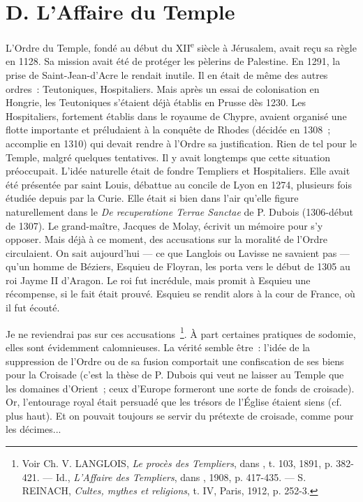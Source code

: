 \documentclass[french,twoside]{book} %
\begin{document}
\section[{D. L’Affaire du Temple }]{D. L’Affaire du Temple \protect\footnotemark }
\label{c06d}
\noindent L’Ordre du Temple, fondé au début du XII\textsuperscript{e} siècle à Jérusalem, avait reçu sa règle en 1128. Sa mission avait été de protéger les pèlerins de Palestine. En 1291, la prise de Saint-Jean-d’Acre le rendait inutile. Il en était de même des autres ordres : Teutoniques, Hospitaliers. Mais après un essai de colonisation en Hongrie, les Teutoniques s’étaient déjà établis en Prusse dès 1230. Les Hospitaliers, fortement établis dans le royaume de Chypre, avaient organisé une flotte importante et préludaient à la conquête de Rhodes (décidée en 1308 ; accomplie en 1310) qui devait rendre à l’Ordre sa justification. Rien de tel pour le Temple, malgré quelques tentatives. Il y avait longtemps que cette situation préoccupait. L’idée naturelle était de fondre Templiers et Hospitaliers. Elle avait été présentée par saint Louis, débattue au concile de Lyon en 1274, plusieurs fois étudiée depuis par la Curie. Elle était si bien dans l’air qu’elle figure naturellement dans le {\itshape De recuperatione Terrae Sanctae} de P. Dubois (1306-début de 1307). Le grand-maître, Jacques de Molay, écrivit un mémoire pour s’y opposer. Mais déjà à ce moment, des accusations sur la moralité de l’Ordre circulaient. On sait aujourd’hui — ce que Langlois ou Lavisse ne savaient pas — qu’un homme de Béziers, Esquieu de Floyran, les porta vers le début de 1305 au roi Jayme II d’Aragon. Le roi fut incrédule, mais promit à Esquieu une récompense, si le fait était prouvé. Esquieu se rendit alors à la cour de France, où il fut écouté.\par
Je ne reviendrai pas sur ces accusations \footnote{ Voir Ch. V. LANGLOIS, {\itshape Le procès des Templiers}, dans \href{http://gallica.bnf.fr/document?O=N087160}{}, t. 103, 1891, p. 382-421. — Id., {\itshape L’Affaire des Templiers}, dans \href{http://gallica.bnf.fr/document?O=N054717}{}, 1908, p. 417-435. — S. REINACH, {\itshape Cultes, mythes et religions}, t. IV, Paris, 1912, p. 252-3.}. À part certaines pratiques de sodomie, elles sont évidemment calomnieuses. La vérité semble être : l’idée de la suppression de l’Ordre ou de sa fusion comportait une confiscation de ses biens pour la Croisade (c’est la thèse de P. Dubois qui veut ne laisser au Temple que les domaines d’Orient ; ceux d’Europe formeront une sorte de fonds de croisade). Or, l’entourage royal était persuadé que les trésors de l’Église étaient siens (cf. plus haut). Et on pouvait toujours se servir du prétexte de croisade, comme pour les décimes...\par
\end{document}
